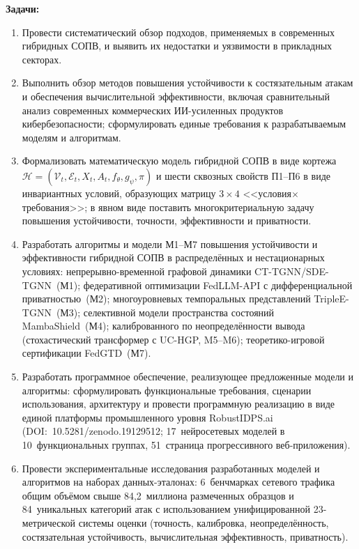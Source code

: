 \documentclass[12pt,a5paper]{article}
\begin{document}
\textbf{Задачи:}

\begin{enumerate}
\item Провести систематический обзор подходов, применяемых
в современных гибридных СОПВ, и выявить их недостатки и
уязвимости в прикладных секторах.

\item Выполнить обзор методов повышения устойчивости к
состязательным атакам и обеспечения вычислительной
эффективности, включая сравнительный анализ современных
коммерческих ИИ-усиленных продуктов кибербезопасности;
сформулировать единые требования к разрабатываемым моделям
и алгоритмам.

\item Формализовать математическую модель гибридной СОПВ в
виде кортежа $\mathcal{H} = (\mathcal{V}_t, \mathcal{E}_t,
X_t, A_t, f_\theta, g_\psi, \pi)$ и шести сквозных свойств
П1--П6 в виде инвариантных условий, образующих матрицу
$3\times4$ <<условия$\times$требования>>; в явном виде
поставить многокритериальную задачу повышения устойчивости,
точности, эффективности и приватности.

\item Разработать алгоритмы и модели М1--М7 повышения
устойчивости и эффективности гибридной СОПВ в распределённых
и нестационарных условиях: непрерывно-временной графовой
динамики CT-TGNN/SDE-TGNN~(М1); федеративной оптимизации
FedLLM-API с дифференциальной приватностью~(М2);
многоуровневых темпоральных представлений TripleE-TGNN~(М3);
селективной модели пространства состояний MambaShield~(М4);
калиброванного по неопределённости вывода (стохастический
трансформер с UC-HGP, M5--M6); теоретико-игровой
сертификации FedGTD~(М7).

\item Разработать программное обеспечение, реализующее
предложенные модели и алгоритмы: сформулировать функциональные
требования, сценарии использования, архитектуру и провести
программную реализацию в виде единой платформы промышленного
уровня RobustIDPS.ai (DOI:~10.5281/zenodo.19129512;
17~нейросетевых моделей в 10~функциональных группах,
51~страница прогрессивного веб-приложения).

\item Провести экспериментальные исследования разработанных
моделей и алгоритмов на наборах данных-эталонах:
6~бенчмарках сетевого трафика общим объёмом свыше
84,2~миллиона размеченных образцов и 84~уникальных категорий
атак с использованием унифицированной 23-метрической системы
оценки (точность, калибровка, неопределённость, состязательная
устойчивость, вычислительная эффективность, приватность).


\end{enumerate}
\end{document}
